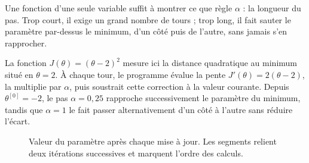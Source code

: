 \begin{lecture}
Une fonction d'une seule variable suffit à montrer ce que règle $\alpha$ : la
longueur du pas. Trop court, il exige un grand nombre de tours ; trop long, il
fait sauter le paramètre par-dessus le minimum, d'un côté puis de l'autre, sans
jamais s'en rapprocher.
\end{lecture}

La fonction $J(\theta)=(\theta-2)^2$ mesure ici la distance quadratique au
minimum situé en $\theta=2$. À chaque tour, le programme évalue la pente
$J'(\theta)=2(\theta-2)$, la multiplie par $\alpha$, puis soustrait cette
correction à la valeur courante. Depuis $\theta^{[0]}=-2$, le pas
$\alpha=0{,}25$ rapproche successivement le paramètre du minimum, tandis que
$\alpha=1$ le fait passer alternativement d'un côté à l'autre sans réduire
l'écart.

\begin{figure}[htbp]
\centering
\begin{minipage}[t]{.48\textwidth}
\centering
{}
\end{minipage}\hfill
\begin{minipage}[t]{.48\textwidth}
\centering
{}
\end{minipage}
\caption{Valeur du paramètre après chaque mise à jour. Les segments relient deux
itérations successives et marquent l'ordre des calculs.}
\label{fig:learning-rate-scalar}
\end{figure}


